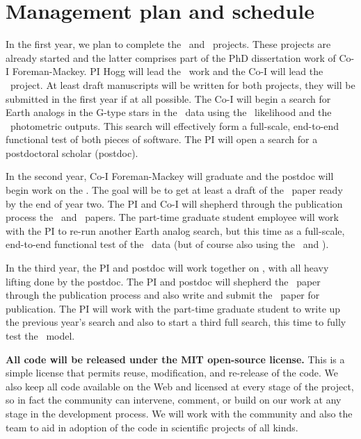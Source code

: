 \documentclass[letterpaper,12pt,preprint]{hack_aastex}
\begin{document}
\section{Management plan and schedule}

In the first year, we plan to complete the \OWL\ and \George\ projects.
These projects are already started and the latter comprises part of the PhD
dissertation work of Co-I Foreman-Mackey.
PI Hogg will lead the \OWL\ work and the Co-I will lead the \George\ project.
At least draft manuscripts will be written for both projects, they will
be submitted in the first year if at all possible.
The Co-I will begin a search for Earth analogs in the G-type stars in the
\Kepler\ data using the \George\ likelihood and the \OWL\ photometric outputs.
This search will effectively form a full-scale, end-to-end functional test of
both pieces of software.
The PI will open a search for a postdoctoral scholar (postdoc).

In the second year, Co-I Foreman-Mackey will graduate and the postdoc will
begin work on the \PLM.
The goal will be to get at least a draft of the \PLM\ paper ready by the end
of year two.
The PI and Co-I will shepherd through the publication process the \OWL\ and
\George\ papers.
The part-time graduate student employee will work with the PI to
re-run another Earth analog search, but this time
as a full-scale, end-to-end functional test of the \PLM\ data (but of course
also using the \OWL\ and \George).

In the third year, the PI and postdoc will work together on \kpsf, with all
heavy lifting done by the postdoc.
The PI and postdoc will shepherd the \PLM\ paper through the publication
process and also write and submit the \kpsf\ paper for publication.
The PI will work with the part-time graduate student to write up the previous
year's search and also to start a third full search, this time to
fully test the \kpsf\ model.

\textbf{All code will be released under the MIT open-source license.}
This is a simple license that permits reuse, modification, and re-release of
the code.
We also keep all code available on the Web and licensed at every stage of
the project, so in fact the community can intervene, comment, or build on our
work at any stage in the development process.
We will work with the community and also the  team to aid in
adoption of the code in scientific projects of all kinds.
\end{document}
